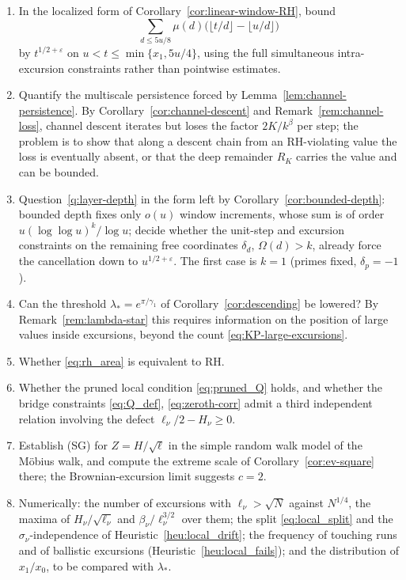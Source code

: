 \documentclass[11pt]{amsart}
\numberwithin{equation}{section}
\theoremstyle{plain}
\theoremstyle{definition}
\theoremstyle{remark}
\newcommand{\eps}{\varepsilon}
\begin{document}
\begin{enumerate}[label=\textup{(\arabic*)}]
\item In the localized form of Corollary~\ref{cor:linear-window-RH}, bound
\[
\sum_{d\le5u/8}\mu(d)
\bigl(\lfloor t/d\rfloor-\lfloor u/d\rfloor\bigr)
\]
by $t^{1/2+\eps}$ on
$u<t\le\min\{x_1,5u/4\}$, using the full simultaneous intra-excursion
constraints rather than pointwise estimates.
\item Quantify the multiscale persistence forced by
Lemma~\ref{lem:channel-persistence}.  By Corollary~\ref{cor:channel-descent}
and Remark~\ref{rem:channel-loss}, channel descent iterates but loses the
factor $2K/k^\beta$ per step; the problem is to show that along a descent
chain from an RH-violating value the loss is eventually absent, or that the
deep remainder $R_K$ carries the value and can be bounded.
\item Question~\ref{q:layer-depth} in the form left by
Corollary~\ref{cor:bounded-depth}: bounded depth fixes only $o(u)$ window
increments, whose sum is of order $u(\log\log u)^k/\log u$; decide whether
the unit-step and excursion constraints on the remaining free coordinates
$\delta_d$, $\Omega(d)>k$, already force the cancellation down to
$u^{1/2+\eps}$. The first case is $k=1$ (primes fixed, $\delta_p=-1$).
\item Can the threshold $\lambda_*=e^{\pi/\gamma_1}$ of
Corollary~\ref{cor:descending} be lowered? By
Remark~\ref{rem:lambda-star} this requires information on the position of
large values inside excursions, beyond the count
\eqref{eq:KP-large-excursions}.
\item Whether \eqref{eq:rh_area} is equivalent to RH.
\item Whether the pruned local condition \eqref{eq:pruned_Q} holds, and
whether the bridge constraints \eqref{eq:Q_def}, \eqref{eq:zeroth-corr}
admit a third independent relation involving the defect
$\ell_\nu/2-H_\nu\ge0$.
\item Establish (SG) for $Z=H/\sqrt\ell$ in the simple random walk model of
the M\"obius walk, and compute the extreme scale of
Corollary~\ref{cor:ev-square} there; the Brownian-excursion limit suggests
$c=2$.
\item Numerically: the number of excursions with $\ell_\nu>\sqrt N$ against
$N^{1/4}$, the maxima of $H_\nu/\sqrt{\ell_\nu}$ and $\beta_\nu/\ell_\nu^{3/2}$
over them; the split \eqref{eq:local_split} and the $\sigma_\nu$-independence
of Heuristic~\ref{heu:local_drift}; the frequency of touching runs and of
ballistic excursions (Heuristic~\ref{heu:local_fails}); and the distribution
of $x_1/x_0$, to be compared with $\lambda_*$.
\end{enumerate}
\end{document}
